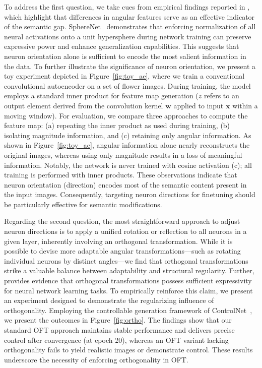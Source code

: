 To address the first question, we take cues from empirical findings reported in \cite{liu2018decoupled,chen2020angular}, which highlight that differences in angular features serve as an effective indicator of the semantic gap. SphereNet~\cite{liu2017deep} demonstrates that enforcing normalization of all neural activations onto a unit hypersphere during network training can preserve expressive power and enhance generalization capabilities. This suggests that neuron orientation alone is sufficient to encode the most salient information in the data. To further illustrate the significance of neuron orientation, we present a toy experiment depicted in Figure~\ref{fig:toy_ae}, where we train a conventional convolutional autoencoder on a set of flower images. During training, the model employs a standard inner product for feature map generation ($z$ refers to an output element derived from the convolution kernel $\bm{w}$ applied to input $\bm{x}$ within a moving window). For evaluation, we compare three approaches to compute the feature map: (a) repeating the inner product as used during training, (b) isolating magnitude information, and (c) retaining only angular information. As shown in Figure~\ref{fig:toy_ae}, angular information alone nearly reconstructs the original images, whereas using only magnitude results in a loss of meaningful information. Notably, the network is never trained with cosine activation (c); all training is performed with inner products. These observations indicate that neuron orientation (direction) encodes most of the semantic content present in the input images. Consequently, targeting neuron directions for finetuning should be particularly effective for semantic modifications.

Regarding the second question, the most straightforward approach to adjust neuron directions is to apply a unified rotation or reflection to all neurons in a given layer, inherently involving an orthogonal transformation. While it is possible to devise more adaptable angular transformations—such as rotating individual neurons by distinct angles—we find that orthogonal transformations strike a valuable balance between adaptability and structural regularity. Further, \cite{liu2021orthogonal} provides evidence that orthogonal transformations possess sufficient expressivity for neural network learning tasks. To empirically reinforce this claim, we present an experiment designed to demonstrate the regularizing influence of orthogonality. Employing the controllable generation framework of ControlNet~\cite{zhang2023adding}, we present the outcomes in Figure~\ref{fig:ortho}. The findings show that our standard OFT approach maintains stable performance and delivers precise control after convergence (at epoch 20), whereas an OFT variant lacking orthogonality fails to yield realistic images or demonstrate control. These results underscore the necessity of enforcing orthogonality in OFT.

